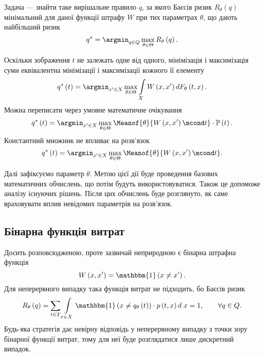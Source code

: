 Задача --- знайти таке вирішальне правило $q$,
за якого Баєсів ризик $R_{\theta}\left( q \right)$ мінімальний
для даної функції штрафу $W$ при тих параметрах $\theta$,
що дають найбільший ризик \cite{schlesinger:2002}
\begin{equation*}
  q^* = \argmin_{q \in Q}
        \max\limits_{\theta \in \Theta} R_{\theta}\left( q \right).
\end{equation*}

Оскільки зображення $t$ не залежать одне від одного,
мінімізація і максимізація суми
еквівалентна мінімізації і максимізації кожного її елементу
\begin{equation*}
  q^*\left( t \right)
  = \argmin_{x' \in X} \max\limits_{\theta \in \Theta}
    \int\limits_{X}
    W \left( x, x' \right)
    d F_{\theta}\left( t, x \right).
\end{equation*}
Можна переписати через умовне математичне очікування
\begin{equation*}
  q^*\left( t \right)
  = \argmin_{x' \in X} \max\limits_{\theta \in \Theta}
    \Meanof{\theta}{W\left( x, x' \right) \mcond t }
    \cdot \mathbb{P}\left( t \right).
\end{equation*}
Константний множник не впливає на розв'язок
\begin{equation*}
  q^*\left( t \right)
  = \argmin_{x' \in X} \max\limits_{\theta \in \Theta}
    \Meanof{\theta}{W\left( x, x' \right) \mcond t}.
\end{equation*}

Далі зафіксуємо параметр $\theta$.
Метою цієї дії буде проведення базових математичних обчислень,
що потім будуть використовуватися.
Також це допоможе аналізу існуючих рішень.
Після цих обчислень буде розглянуто,
як саме враховувати вплив невідомих параметрів на розв'язок.

\subsection{Бінарна функція витрат}

Досить розповсюдженою, проте зазвичай неприродною є бінарна штрафна функція
\begin{equation*}
  W \left( x, x' \right)
  = \mathbbm{1} \left( x \neq x' \right).
\end{equation*}
Для неперервного випадку така функція витрат не підходить,
бо Баєсів ризик
\begin{equation*}
  R_{\theta}\left( q \right)
  = \sum\limits_{t \in T}
    \int\limits_{x \in X}
    \mathbbm{1} \left( x \neq q_{\theta}\left( t \right) \right)
    \cdot p\left( t, x \right) d\; x
  = 1,\qquad
  \forall q \in Q.
\end{equation*}
Будь-яка стратегія дає невірну відповідь у неперервному випадку
з точки зору бінарної функції витрат,
тому для неї буде розглядатися лише дискретний випадок.

